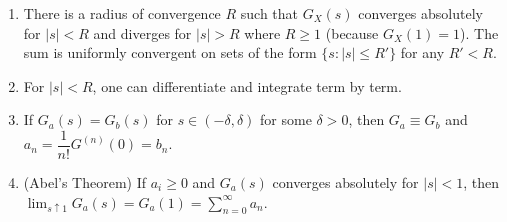 \documentclass[11pt,singlecolumn, openany, citestyle=authoryear]{elegantbook}
\begin{document}
\begin{CJK}{UTF8}{gbsn}
\begin{remark}
    \begin{enumerate}
        \item There is a radius of convergence $R$ such that $G_X(s)$ converges 
        absolutely for $|s|< R$ and diverges for $|s|>R$ where $R\geqslant 1$ 
        (because $G_X(1)=1$). The sum is uniformly convergent on sets of the
        form $\{s : |s| \leqslant R'\}$ for any $R' < R$.
        \item For $|s|<R$, one can differentiate and integrate term by term.
        \item If $G_a(s)=G_b(s)$ for $s\in(-\delta,\delta)$ for some $\delta>0$,
        then $G_a \equiv G_b$ and $a_n = \dfrac{1}{n!}G^{(n)}(0)=b_n$.
        \item (Abel's Theorem) If $a_i\geqslant 0$ and $G_a(s)$ converges absolutely for 
        $|s|<1$, then 
        $\displaystyle \lim_{s\uparrow 1}G_a(s)=G_a(1)=\sum_{n=0}^\infty a_n$.
    \end{enumerate}
\end{remark}


\end{CJK}
\end{document}
